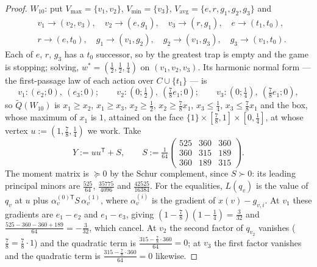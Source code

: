 \documentclass[11pt]{article}
\theoremstyle{plain}
\theoremstyle{definition}
\newcommand{\Vmax}{V_{\max}}
\newcommand{\Vmin}{V_{\min}}
\newcommand{\Vavg}{V_{\mathrm{avg}}}
\begin{document}
\begin{proof}
$W_{10}$: put $\Vmax=\{v_1,v_2\}$, $\Vmin=\{v_3\}$, $\Vavg=\{e,r,g_1,g_2,g_3\}$ and
\[
 \begin{aligned}
  &v_1\to(v_2,v_3),\quad v_2\to(e,g_1),\quad v_3\to(r,g_1),\quad e\to(t_1,t_0),\\
  &r\to(e,t_0),\quad g_1\to(v_1,g_2),\quad g_2\to(v_1,g_3),\quad g_3\to(v_1,t_0).
 \end{aligned}
\]
Each of $e$, $r$, $g_3$ has a $t_0$ successor, so by  the
greatest trap is empty and the game is stopping; solving,
$w^\ast=(\tfrac12,\tfrac12,\tfrac14)$ on $(v_1,v_2,v_3)$. Its harmonic normal
form --- the first-passage law of each action over $C\cup\{t_1\}$ --- is
\[
  v_1:(e_2;0),\ (e_3;0);\qquad
  v_2:(0;\tfrac12),\ (\tfrac78e_1;0);\qquad
  v_3:(0;\tfrac14),\ (\tfrac78e_1;0),
\]
so $\tilde Q(W_{10})$ is $x_1\ge x_2$, $x_1\ge x_3$, $x_2\ge\tfrac12$,
$x_2\ge\tfrac78x_1$, $x_3\le\tfrac14$, $x_3\le\tfrac78x_1$ and the box, whose
maximum of $x_1$ is $1$, attained on the face
$\{1\}\times[\tfrac78,1]\times[0,\tfrac14]$, at whose vertex
$u:=(1,\tfrac78,\tfrac14)$ we work. Take
\[
  Y:=uu^{\mathsf T}+S,\qquad
  S:=\tfrac1{64}\begin{pmatrix}525&360&360\\360&315&189\\360&189&315\end{pmatrix}.
\]
The moment matrix is $\succeq0$ by the Schur complement, since $S\succ0$: its
leading principal minors are $\tfrac{525}{64}$, $\tfrac{35775}{4096}$ and
$\tfrac{42525}{16384}$. For the equalities, $L(q_v)$ is the value of $q_v$ at
$u$ plus $\alpha_v^{(0)\mathsf T}S\,\alpha_v^{(1)}$, where $\alpha_v^{(i)}$ is
the gradient of $x(v)-g_{v,i}$. At $v_1$ these gradients are $e_1-e_2$ and
$e_1-e_3$, giving $(1-\tfrac78)(1-\tfrac14)=\tfrac3{32}$ and
$\tfrac{525-360-360+189}{64}=-\tfrac3{32}$, which cancel. At $v_2$ the second
factor of $q_{v_2}$ vanishes ($\tfrac78=\tfrac78\cdot1$) and the quadratic term
is $\tfrac{315-\tfrac78\cdot360}{64}=0$; at $v_3$ the first factor vanishes and
the quadratic term is $\tfrac{315-\tfrac78\cdot360}{64}=0$ likewise.


\end{proof}
\end{document}
